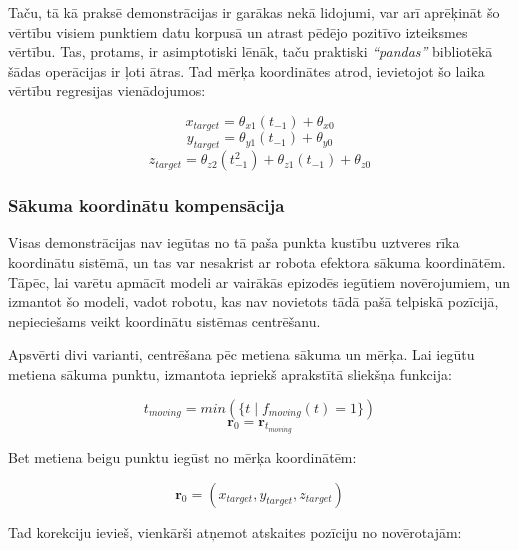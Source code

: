 \documentclass[12pt, a4paper]{article}
\numberwithin{equation}{section} %
\begin{document}
Taču, tā kā praksē demonstrācijas ir garākas nekā lidojumi, var arī aprēķināt šo vērtību visiem punktiem datu korpusā un atrast pēdējo pozitīvo izteiksmes vērtību. Tas, protams, ir asimptotiski lēnāk, taču praktiski \textit{``pandas''} bibliotēkā šādas operācijas ir ļoti ātras. Tad mērķa koordinātes atrod, ievietojot šo laika vērtību regresijas vienādojumos:

\begin{equation}
    x_{target} = \theta_{x1}(t_{-1}) + \theta_{x0}
\end{equation}
\begin{equation}
    y_{target} = \theta_{y1}(t_{-1}) + \theta_{y0}
\end{equation}
\begin{equation}
    z_{target} = \theta_{z2}(t_{-1}^2) + \theta_{z1}(t_{-1}) + \theta_{z0}
\end{equation}

\subsubsection{Sākuma koordinātu kompensācija}

Visas demonstrācijas nav iegūtas no tā paša punkta kustību uztveres rīka koordinātu sistēmā, un tas var nesakrist ar robota efektora sākuma koordinātēm. Tāpēc, lai varētu apmācīt modeli ar vairākās epizodēs iegūtiem novērojumiem, un izmantot šo modeli, vadot robotu, kas nav novietots tādā pašā telpiskā pozīcijā, nepieciešams veikt koordinātu sistēmas centrēšanu.

Apsvērti divi varianti, centrēšana pēc metiena sākuma un mērķa. Lai iegūtu metiena sākuma punktu, izmantota iepriekš aprakstītā sliekšņa funkcija:

\begin{equation}
    t_{moving} = min(\lbrace t \mid f_{moving}(t) = 1 \rbrace)
\end{equation}
\begin{equation}
     \boldsymbol{r}_{0} =  \boldsymbol{r}_{t_{moving}}
\end{equation}

Bet metiena beigu punktu iegūst no mērķa koordinātēm:

\begin{equation}
     \boldsymbol{r}_{0} = ( x_{target}, y_{target}, z_{target} )
\end{equation}

Tad korekciju ievieš, vienkārši atņemot atskaites pozīciju no novērotajām:
\end{document}
